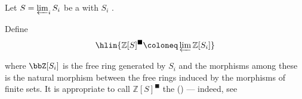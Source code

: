 \begin{definition} \label{definition:solidification_of_polynomial_ring_of_profinite_set}
    Let $S = \varprojlim_i S_i$  be a  with $S_i$  . 

    Define 
    $$\hlin{\mathbb{Z}[S]^\blacksquare \coloneq \varprojlim \mathbb{Z}[S_i]}$$
    
    where $\bbZ[S_i]$ is the free ring generated by $S_i$ and the morphisms among these is the natural morphism between the free rings induced by the morphisms of finite sets. It is appropriate to call $\mathbb{Z}[S]^\blacksquare$ the  () --- indeed, see \TODO{}
\end{definition}